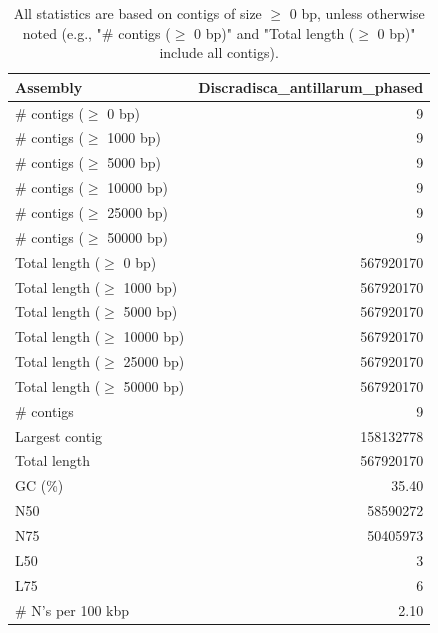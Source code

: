 \documentclass[12pt,a4paper]{article}
\begin{document}
\begin{table}[ht]
\begin{center}
\caption{All statistics are based on contigs of size $\geq$ 0 bp, unless otherwise noted (e.g., "\# contigs ($\geq$ 0 bp)" and "Total length ($\geq$ 0 bp)" include all contigs).}
\begin{tabular}{|l*{1}{|r}|}
\hline
Assembly & Discradisca\_antillarum\_phased \\ \hline
\# contigs ($\geq$ 0 bp) & 9 \\ \hline
\# contigs ($\geq$ 1000 bp) & 9 \\ \hline
\# contigs ($\geq$ 5000 bp) & 9 \\ \hline
\# contigs ($\geq$ 10000 bp) & 9 \\ \hline
\# contigs ($\geq$ 25000 bp) & 9 \\ \hline
\# contigs ($\geq$ 50000 bp) & 9 \\ \hline
Total length ($\geq$ 0 bp) & 567920170 \\ \hline
Total length ($\geq$ 1000 bp) & 567920170 \\ \hline
Total length ($\geq$ 5000 bp) & 567920170 \\ \hline
Total length ($\geq$ 10000 bp) & 567920170 \\ \hline
Total length ($\geq$ 25000 bp) & 567920170 \\ \hline
Total length ($\geq$ 50000 bp) & 567920170 \\ \hline
\# contigs & 9 \\ \hline
Largest contig & 158132778 \\ \hline
Total length & 567920170 \\ \hline
GC (\%) & 35.40 \\ \hline
N50 & 58590272 \\ \hline
N75 & 50405973 \\ \hline
L50 & 3 \\ \hline
L75 & 6 \\ \hline
\# N's per 100 kbp & 2.10 \\ \hline
\end{tabular}
\end{center}
\end{table}
\end{document}
